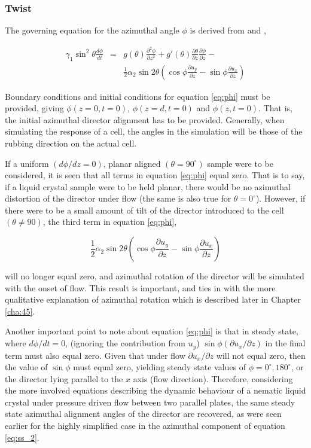 \subsubsection{Twist}
\label{sec:phi}

The governing equation for the azimuthal angle $\phi$ is derived from \cite{Cornford2008} and \cite{Stewart2004},

\begin{eqnarray}
\gamma_1 \sin^2\theta\frac{d\phi}{dt}&=&g\left(\theta\right)\frac{\partial^2\phi}{\partial z^2} + 
g'\left(\theta\right)\frac{\partial\theta}{\partial z}\frac{\partial\phi}{\partial z}- \\
&&\frac{1}{2}\alpha_2\sin2\theta\left(\cos\phi\frac{\partial u_y}{\partial z}-\sin\phi\frac{\partial u_x}{\partial z}\right)
\label{eq:phi}
\end{eqnarray}

\noindent Boundary conditions and initial conditions for equation \ref{eq:phi} must be provided, giving $\phi\left(z=0,t=0\right)$, $\phi\left(z=d,t=0\right)$ and $\phi\left(z,t=0\right)$. That is, the initial azimuthal director alignment has to be provided. Generally, when simulating the response of a cell, the angles in the simulation will be those of the rubbing direction on the actual cell.

If a uniform $\left(d\phi/dz=0\right)$, planar aligned $\left(\theta=90^{\circ}\right)$ sample were to be considered, it is seen that all terms in equation \ref{eq:phi} equal zero. That is to say, if a liquid crystal sample were to be held planar, there would be no azimuthal distortion of the director under flow (the same is also true for $\theta=0^{\circ}$). However, if there were to be a small amount of tilt of the director introduced to the cell $\left(\theta\neq90\right)$, the third term in equation \ref{eq:phi},

\begin{equation}
\frac{1}{2}\alpha_2\sin2\theta\left(\cos\phi\frac{\partial u_y}{\partial z}-\sin\phi\frac{\partial u_x}{\partial z}\right)
\end{equation}

\noindent will no longer equal zero, and azimuthal rotation of the director will be simulated with the onset of flow. This result is important, and ties in with the more qualitative explanation of azimuthal rotation which is described later in Chapter \ref{cha:45}.

Another important point to note about equation \ref{eq:phi} is that in steady state, where $d\phi/dt=0$, (ignoring the contribution from $u_y$) $\sin\phi\left(\partial u_x/\partial z\right)$ in the final term must also equal zero. Given that under flow $\partial u_x/\partial z$ will not equal zero, then the value of $\sin\phi$ must equal zero, yielding steady state values of $\phi=0^{\circ},180^{\circ}$, or the director lying parallel to the $x$ axis (flow direction). Therefore, considering the more involved equations describing the dynamic behaviour of a nematic liquid crystal under pressure driven flow between two parallel plates, the same steady state azimuthal alignment angles of the director are recovered, as were seen earlier for the highly simplified case in the azimuthal component of equation \ref{eq:ss_2}.


